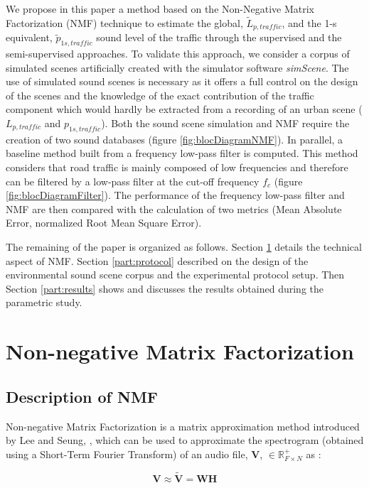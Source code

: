 \documentclass[twocolumn,a4paper,10pt]{article}
\newcommand{\ml}[1]{\textcolor{blue}{ Mathieu: #1}}
\begin{document}
We propose in this paper a method based on the Non-Negative Matrix Factorization (NMF) technique to estimate the global, $\tilde{L}_{p,traffic}$, and the 1-s equivalent, $\tilde{p}_{1s,traffic}$ sound level of the traffic through the supervised and the semi-supervised approaches. To validate this approach, we consider a corpus of simulated scenes artificially created with the simulator software \textit{simScene}. The use of simulated sound scenes is necessary as it offers a full control on the design of the scenes and the knowledge of the exact contribution of the traffic component which would hardly be extracted from a recording of an urban scene ($L_{p,traffic}$ and $p_{1s,traffic}$). Both the sound scene simulation and NMF require the creation of two sound databases (figure  \ref{fig:blocDiagramNMF}). In parallel, a baseline method built from a frequency low-pass filter is computed. This method considers that road traffic is mainly composed of low frequencies and therefore can be filtered by a low-pass filter at the cut-off frequency $f_c$ (figure \ref{fig:blocDiagramFilter}). The performance of the frequency low-pass filter and NMF are then compared with the calculation of two metrics (Mean Absolute Error, normalized Root Mean Square Error). 

The remaining of the paper is organized as follows. Section \ref{part:nmf} details the technical aspect of NMF. Section \ref{part:protocol} described on the design of the environmental sound scene corpus and the experimental protocol setup. Then Section \ref{part:results} shows and discusses the results obtained during the parametric study.


\section{Non-negative Matrix Factorization}\label{part:nmf}
\subsection{Description of NMF}
Non-negative Matrix Factorization is a matrix approximation method introduced by Lee and Seung, \cite{lee_learning_1999}, which can be used to approximate the spectrogram (obtained using a Short-Term Fourier Transform) of an audio file, $\mathbf{V}$, $\in \mathbb{R}^+_{F \times N}$ as :

\begin{equation}\label{eq:nmf}
\mathbf{V} \approx \mathbf{\tilde{V}} = \mathbf{WH}
\end{equation}
\end{document}

